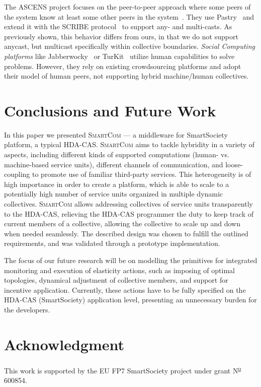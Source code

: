 \documentclass{llncs}
\newcommand{\mdl}{\textsc{SmartCom}}
\begin{document}
  The ASCENS project focuses on the peer-to-peer approach where some peers of the system know at least some other peers in the system~\cite{AutonomicCloud}. They use Pastry~\cite{Pastry} and extend it with the SCRIBE protocol~\cite{Scribe} to support any- and multi-casts. As previously shown, this behavior differs from ours, in that we do not support anycast, but multicast specifically within collective boundaries.
  \emph{Social Computing platforms} like Jabberwocky~\cite{Jabberwocky} or TurKit~\cite{Turkit} utilize human capabilities to solve problems. However, they rely on existing crowdsourcing platforms and adopt their model of human peers, not supporting hybrid machine/human collectives.


\section{Conclusions and Future Work}
\label{sec:conclusion}

  In this paper we presented \mdl{} --- a middleware for SmartSociety platform, a typical HDA-CAS. \mdl{} aims to tackle hybridity in a variety of aspects, including different kinds of supported computations (human- vs. machine-based service units), different channels of communication, and loose-coupling to promote use of familiar third-party services. This heterogeneity is of high importance in order to create a platform, which is able to scale to a potentially high number of service units organized in multiple dynamic collectives. \mdl{} allows addressing collectives of service units transparently to the HDA-CAS, relieving the HDA-CAS programmer the duty to keep track of current members of a collective, allowing the collective to scale up and down when needed seamlessly. The described design was chosen to fulfill the outlined requirements, and was validated through a prototype implementation. 

  The focus of our future research will be on modelling the primitives for integrated monitoring and execution of elasticity actions, such as imposing of optimal topologies, dynamical adjustment of collective members, and support for incentive application. Currently, these actions have to be fully specified on the HDA-CAS (SmartSociety) application level, presenting an unnecessary burden for the developers.







\section*{Acknowledgment}
This work is supported by the EU FP7 SmartSociety project under grant N\textsuperscript{\underline{o}} 600854.
\end{document}
